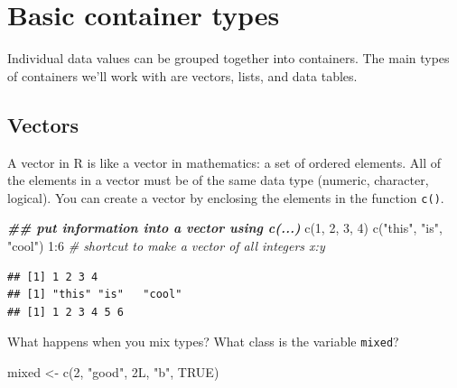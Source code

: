 \documentclass[
  oneside]{book}
\newenvironment{Shaded}{\begin{snugshade}}{\end{snugshade}}
\newcommand{\CommentTok}[1]{\textcolor[rgb]{0.56,0.35,0.01}{\textit{#1}}}
\newcommand{\ConstantTok}[1]{\textcolor[rgb]{0.00,0.00,0.00}{#1}}
\newcommand{\DecValTok}[1]{\textcolor[rgb]{0.00,0.00,0.81}{#1}}
\newcommand{\DocumentationTok}[1]{\textcolor[rgb]{0.56,0.35,0.01}{\textbf{\textit{#1}}}}
\newcommand{\FunctionTok}[1]{\textcolor[rgb]{0.00,0.00,0.00}{#1}}
\newcommand{\NormalTok}[1]{#1}
\newcommand{\OtherTok}[1]{\textcolor[rgb]{0.56,0.35,0.01}{#1}}
\newcommand{\SpecialCharTok}[1]{\textcolor[rgb]{0.00,0.00,0.00}{#1}}
\newcommand{\StringTok}[1]{\textcolor[rgb]{0.31,0.60,0.02}{#1}}
\begin{document}
\hypertarget{containers}{%
\section{Basic container types}\label{containers}}

Individual data values can be grouped together into containers. The main types of containers we'll work with are vectors, lists, and data tables.

\hypertarget{vectors}{%
\subsection{Vectors}\label{vectors}}

A vector in R is like a vector in mathematics: a set of ordered elements. All of the elements in a vector must be of the same data type (numeric, character, logical). You can create a vector by enclosing the elements in the function \texttt{c()}.

\begin{Shaded}
\begin{Highlighting}[]
\DocumentationTok{\#\# put information into a vector using c(...)}
\FunctionTok{c}\NormalTok{(}\DecValTok{1}\NormalTok{, }\DecValTok{2}\NormalTok{, }\DecValTok{3}\NormalTok{, }\DecValTok{4}\NormalTok{)}
\FunctionTok{c}\NormalTok{(}\StringTok{"this"}\NormalTok{, }\StringTok{"is"}\NormalTok{, }\StringTok{"cool"}\NormalTok{)}
\DecValTok{1}\SpecialCharTok{:}\DecValTok{6} \CommentTok{\# shortcut to make a vector of all integers x:y}
\end{Highlighting}
\end{Shaded}

\begin{verbatim}
## [1] 1 2 3 4
## [1] "this" "is"   "cool"
## [1] 1 2 3 4 5 6
\end{verbatim}

\begin{try}

What happens when you mix types? What class is the variable \texttt{mixed}?

\begin{Shaded}
\begin{Highlighting}[]
\NormalTok{mixed }\OtherTok{\textless{}{-}} \FunctionTok{c}\NormalTok{(}\DecValTok{2}\NormalTok{, }\StringTok{"good"}\NormalTok{, 2L, }\StringTok{"b"}\NormalTok{, }\ConstantTok{TRUE}\NormalTok{)}
\end{Highlighting}
\end{Shaded}

\end{try}
\end{document}
